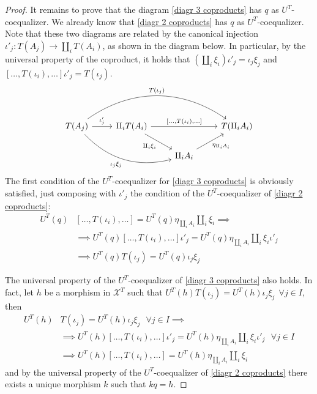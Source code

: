 \begin{subbox}{}
\begin{proof}
It remains to prove that the diagram \eqref{diagr 3 coproducts} has $q$ as $U^T$-coequalizer. We already know that \eqref{diagr 2 coproducts} has $q$ as $U^T$-coequalizer. Note that these two diagrams are related by the canonical injection $\iota'_j:T(A_j) \to \amalg_iT(A_i)$, as shown in the diagram below. In particular, by the universal property of the coproduct, it holds that $(\amalg_i \xi_i) \iota'_j = \iota_j\xi_j$ and $[\ldots,T(\iota_i),\ldots] \iota'_j = T(\iota_j)$.
\[
\begin{tikzcd}
T(A_j) \arrow[r, "\iota'_j"] \arrow[rrr, "T(\iota_j)", bend left=35] \arrow[rrd, "\iota_j\xi_j"', bend right] & \amalg_iT(A_i) \arrow[rr, "{[\ldots,T(\iota_i),\ldots]}"] \arrow[rd, "\amalg_i \xi_i"'] &                                           & T(\amalg_iA_i) \\
                                                                                                              &                                                                                     & \amalg_iA_i \arrow[ru, "\eta_{\amalg_iA_i}"'] &             
\end{tikzcd}
\]
The first condition of the $U^T$-coequalizer for \eqref{diagr 3 coproducts} is obviously satisfied, just composing with $\iota'_j$ the condition of the $U^T$-coequalizer of \eqref{diagr 2 coproducts}:
\begin{align*}
    U^T(q) &[\ldots,T(\iota_i),\ldots] = U^T(q) \eta_{\amalg_iA_i} \amalg_i \xi_i \implies \\[1.5ex]
    &\implies U^T(q) [\ldots,T(\iota_i),\ldots] \iota'_j= U^T(q) \eta_{\amalg_iA_i} \amalg_i \xi_i \iota'_j \\[1.5ex]
    &\implies U^T(q) T(\iota_j) = U^T(q) \iota_j \xi_j 
\end{align*}

The universal property of the $U^T$-coequalizer of \eqref{diagr 3 coproducts} also holds. In fact, let $h$ be a morphism in $\mathcal{X}^T$ such that $U^T(h) T(\iota_j) = U^T(h) \iota_j \xi_j \ \ \forall j \in I$, then 
\begin{align*}
    U^T(h) &T(\iota_j) = U^T(h) \iota_j \xi_j \ \ \ \forall j \in I \implies \\[1.5ex]
    &\implies U^T(h) [\ldots,T(\iota_i),\ldots] \iota'_j= U^T(h) \eta_{\amalg_iA_i} \amalg_i \xi_i \iota'_j \ \ \ \forall j \in I \\[1.5ex]
    &\implies U^T(h) [\ldots,T(\iota_i),\ldots] = U^T(h) \eta_{\amalg_iA_i} \amalg_i \xi_i
\end{align*}
and by the universal property of the $U^T$-coequalizer of \eqref{diagr 2 coproducts} there exists a unique morphism $k$ such that $kq=h$.
\end{proof}
\end{subbox}


